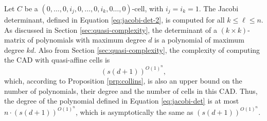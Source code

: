 \documentclass[
]{book}
\theoremstyle{definition}
\theoremstyle{definition}
\theoremstyle{definition}
\theoremstyle{definition}
\theoremstyle{remark}
\begin{document}
Let \(C\) be a \((0,\ldots,0,i_j,0,\ldots,0,i_k,0\ldots,0)\)-cell, with \(i_j = i_k = 1\).
The Jacobi determinant, defined in Equation \eqref{eq:jacobi-det-2}, is computed for all \(k \le \ell \le n\).
As discussed in Section \ref{sec:quasi-complexity}, the determinant of a \((k \times k)\)-matrix of polynomials with maximum degree \(d\) is a polynomial of maximum degree \(kd\).
Also from Section \ref{sec:quasi-complexity}, the complexity of computing the CAD with quasi-affine cells is
\[
(s(d+1))^{O(1)^{n}},
\]
which, according to Proposition \ref{prp:collins}, is also an upper bound on the number of polynomials, their degree and the number of cells in this CAD.
Thus, the degree of the polynomial defined in Equation \eqref{eq:jacobi-det} is at most \(n\cdot(s(d+1))^{O(1)^{n}}\), which is asymptotically the same as
\((s(d+1))^{O(1)^{n}}\).
\end{document}
